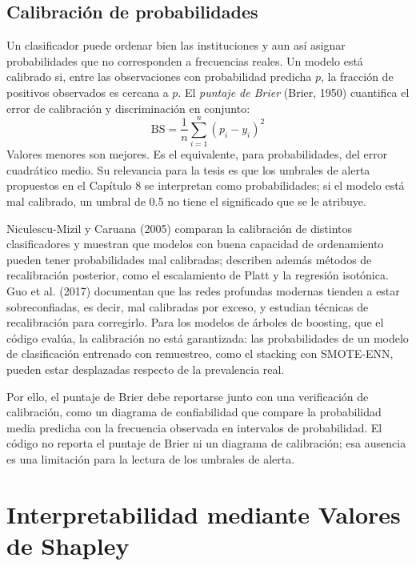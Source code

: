 \subsection{Calibración de probabilidades}
Un clasificador puede ordenar bien las instituciones y aun así asignar probabilidades que no corresponden a frecuencias reales. Un modelo está calibrado si, entre las observaciones con probabilidad predicha $p$, la fracción de positivos observados es cercana a $p$. El \textit{puntaje de Brier} (Brier, 1950) cuantifica el error de calibración y discriminación en conjunto:
\begin{equation}
\text{BS} = \frac{1}{n}\sum_{i=1}^n (p_i - y_i)^2
\label{eq:brier}
\end{equation}
Valores menores son mejores. Es el equivalente, para probabilidades, del error cuadrático medio. Su relevancia para la tesis es que los umbrales de alerta propuestos en el Capítulo 8 se interpretan como probabilidades; si el modelo está mal calibrado, un umbral de 0.5 no tiene el significado que se le atribuye.

Niculescu-Mizil y Caruana (2005) comparan la calibración de distintos clasificadores y muestran que modelos con buena capacidad de ordenamiento pueden tener probabilidades mal calibradas; describen además métodos de recalibración posterior, como el escalamiento de Platt y la regresión isotónica. Guo et al. (2017) documentan que las redes profundas modernas tienden a estar sobreconfiadas, es decir, mal calibradas por exceso, y estudian técnicas de recalibración para corregirlo. Para los modelos de árboles de boosting, que el código evalúa, la calibración no está garantizada: las probabilidades de un modelo de clasificación entrenado con remuestreo, como el stacking con SMOTE-ENN, pueden estar desplazadas respecto de la prevalencia real.

Por ello, el puntaje de Brier debe reportarse junto con una verificación de calibración, como un diagrama de confiabilidad que compare la probabilidad media predicha con la frecuencia observada en intervalos de probabilidad. El código no reporta el puntaje de Brier ni un diagrama de calibración; esa ausencia es una limitación para la lectura de los umbrales de alerta.

\section{Interpretabilidad mediante Valores de Shapley}\label{sec:shapley}

